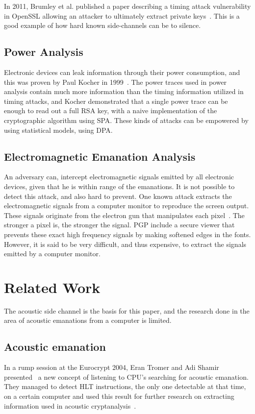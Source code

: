 In 2011, Brumley et al. published a paper describing a timing attack vulnerability in OpenSSL allowing an attacker to ultimately extract private keys~\cite{DBLP:conf/esorics/BrumleyT11}.
This is a good example of how hard known side-channels can be to silence.


\subsection{Power Analysis}\label{chp2:subsec:power_analysis}
Electronic devices can leak information through their power consumption, and this was proven by Paul Kocher in 1999~\cite{DBLP:conf/crypto/KocherJJ99}.
The power traces used in power analysis contain much more information than the timing information utilized in timing attacks, and Kocher demonstrated that a single power trace can be enough to read out a full RSA key, with a naive implementation of the cryptographic algorithm using \gls{SPA}.
These kinds of attacks can be empowered by using statistical models, using \gls{DPA}.


\subsection{Electromagnetic Emanation Analysis}\label{chp2:subsec:electromagnetic_attacks}
An adversary can, intercept electromagnetic signals emitted by all electronic devices, given that he is within range of the emanations. 
It is not possible to detect this attack, and also hard to prevent.
One known attack extracts the electromagnetic signals from a computer monitor to reproduce the screen output.
These signals originate from the electron gun that manipulates each pixel~\cite{url:tempest_sans}. 
The stronger a pixel is, the stronger the signal.
\gls{PGP} include a secure viewer that prevents these exact high frequency signals by making softened edges in the fonts.
However, it is said to be very difficult, and thus expensive, to extract the signals emitted by a computer monitor.


\section{Related Work}\label{chp2:sec:related_work}
The acoustic side channel is the basis for this paper, and the research done in the area of acoustic emanations from a computer is limited.

\subsection{Acoustic emanation}
In a rump session at the Eurocrypt 2004, Eran Tromer and Adi Shamir presented~\cite{tromer2004acoustic} a new concept of listening to CPU's searching for acoustic emanation. 
They managed to detect HLT instructions, the only one detectable at that time, on a certain computer and used this result for further research on extracting information used in acoustic cryptanalysis~\cite{tromer2007hardware}.

